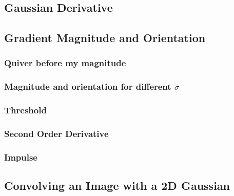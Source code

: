 \documentclass[a4paper,10pt]{article}
\begin{document}
\subsection{Gaussian Derivative}


\subsection{Gradient Magnitude and Orientation}
\subsubsection{Quiver before my magnitude}
\subsubsection{Magnitude and orientation for different $\sigma$}
\subsubsection{Threshold}
\subsubsection{Second Order Derivative}
\subsubsection{Impulse}

\subsection{Convolving an Image with a 2D Gaussian}
\end{document}
